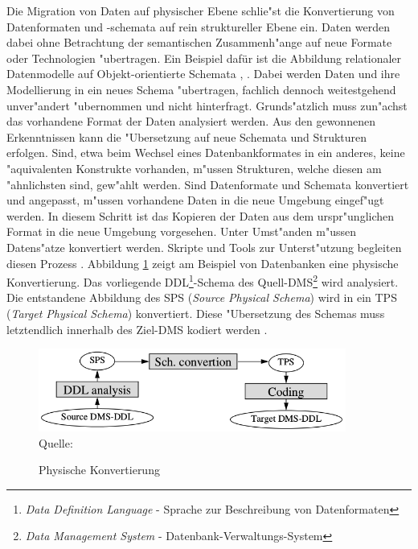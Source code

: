 Die Migration von Daten auf physischer Ebene schlie"st die Konvertierung von Datenformaten und -schemata auf rein struktureller Ebene ein. Daten werden dabei ohne Betrachtung der semantischen Zusammenh"ange auf neue Formate oder Technologien "ubertragen. Ein Beispiel dafür ist die Abbildung relationaler Datenmodelle auf Objekt-orientierte Schemata \citep{alhajj-2001}, \citep{behm-1997}. Dabei werden Daten und ihre Modellierung in ein neues Schema "ubertragen, fachlich dennoch weitestgehend unver"andert "ubernommen und nicht hinterfragt.
\lb
Grunds"atzlich muss zun"achst das vorhandene Format der Daten analysiert werden. Aus den gewonnenen Erkenntnissen kann die "Ubersetzung auf neue Schemata und Strukturen erfolgen. Sind, etwa beim Wechsel eines Datenbankformates in ein anderes, keine "aquivalenten Konstrukte vorhanden, m"ussen Strukturen, welche diesen am "ahnlichsten sind, gew"ahlt werden. 
\lb
Sind Datenformate und Schemata konvertiert und angepasst, m"ussen vorhandene Daten in die neue Umgebung eingef"ugt werden. In diesem Schritt ist das Kopieren der Daten aus dem urspr"unglichen Format in die neue Umgebung vorgesehen. Unter Umst"anden m"ussen Datens"atze konvertiert werden. Skripte und Tools zur Unterst"utzung begleiten diesen Prozess \citep{henrard-2002}.
\lb
Abbildung \ref{pic:conversion_physical} zeigt am Beispiel von Datenbanken eine physische Konvertierung. Das vorliegende DDL\footnote{\textit{Data Definition Language} - Sprache zur Beschreibung von Datenformaten}-Schema des Quell-DMS\footnote{\textit{Data Management System} - Datenbank-Verwaltungs-System} wird analysiert. Die entstandene Abbildung des SPS (\textit{Source Physical Schema}) wird in ein TPS (\textit{Target Physical Schema}) konvertiert. Diese "Ubersetzung des Schemas muss letztendlich innerhalb des Ziel-DMS kodiert werden \citep{henrard-2002}.

\begin{figure}[h!]
	\centering
	\caption{Physische Konvertierung}
	\label{pic:conversion_physical}
	\includegraphics[width=0.9\textwidth]{../images/strategies_fig_02a.png} \\
	\tiny Quelle: \citep[Abbildung~2]{henrard-2002}
\end{figure}

